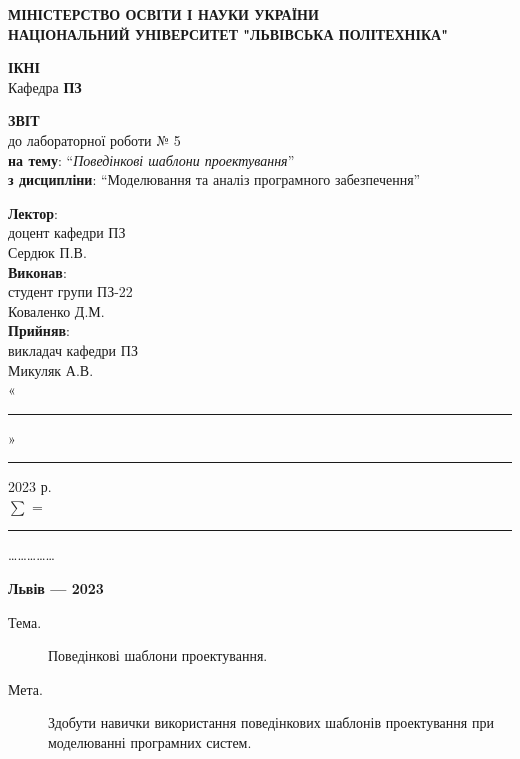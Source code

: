 \documentclass[oneside,14pt]{extarticle}
\newcommand\subject{Моделювання та аналіз програмного забезпечення}
\newcommand\lecturer{доцент кафедри ПЗ \\ Сердюк П.В.}
\newcommand\teacher{викладач кафедри ПЗ \\ Микуляк А.В.}
\newcommand\mygroup{ПЗ-22}
\newcommand\lab{5}
\newcommand\theme{Поведінкові шаблони проектування}
\newcommand\purpose{Здобути навички використання поведінкових шаблонів проектування при моделюванні програмних систем}
\begin{document}
\begin{normalsize}
	\begin{titlepage}
		\thispagestyle{empty}
		\begin{center}
			\textbf{МІНІСТЕРСТВО ОСВІТИ І НАУКИ УКРАЇНИ\\
				НАЦІОНАЛЬНИЙ УНІВЕРСИТЕТ "ЛЬВІВСЬКА ПОЛІТЕХНІКА"}
		\end{center}
		\begin{flushright}
			\textbf{ІКНІ}\\
			Кафедра \textbf{ПЗ}
		\end{flushright}
		\vspace{70pt}
		\begin{center}
			\textbf{ЗВІТ}\\
			\vspace{10pt}
			до лабораторної роботи № \lab\\
			\textbf{на тему}: “\textit{\theme}”\\
			\textbf{з дисципліни}: “\subject”
		\end{center}
		\vspace{50pt}
		\begin{flushright}
			
			\textbf{Лектор}:\\
			\lecturer\\
			\vspace{10pt}
			\textbf{Виконав}:\\
			
			студент групи \mygroup\\
			Коваленко Д.М.\\
			\vspace{10pt}
			\textbf{Прийняв}:\\
			
			\teacher\\
			
			\vspace{28pt}
			«\rule{1cm}{0.15mm}» \rule{1.5cm}{0.15mm} 2023 р.\\
			$\sum$ = \rule{1cm}{0.15mm}……………\\
			
		\end{flushright}
		\vspace{\fill}
		\begin{center}
			\textbf{Львів — 2023}
		\end{center}
	\end{titlepage}
		
	\begin{description}
		\item[Тема.] \theme.
		\item[Мета.] \purpose.
	\end{description}


\end{normalsize}
\end{document}
